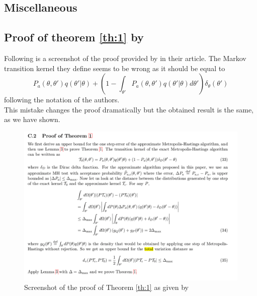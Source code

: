 \documentclass[11pt,a4paper]{report}\usepackage[]{graphicx}\usepackage[]{color}
\begin{document}
\begin{appendix}
\chapter{Miscellaneous}
\section{Proof of theorem \ref{th:1} by \cite{korattikara2014austerity}}

Following is a screenshot of the proof provided by \cite{korattikara2014austerity} in their article. The Markov transition kernel they define seems to be wrong as it should be equal to 
$$P_a(\theta,\theta')q(\theta'|\theta)+\left(1-\int_{\theta'}P_a(\theta,\theta')q(\theta'|\theta)d\theta'\right)\delta_{\theta}(\theta')$$ following the notation of the authors.\\ 
This mistake changes the proof dramatically but the obtained result is the same, as we have shown.
\begin{figure}[H]
    \centering
    \includegraphics[resolution=200]{korattikara_proof.png}
    \caption{Screenshot of the proof of Theorem \ref{th:1} as given by \cite{korattikara2014austerity}}
    \label{fig:korattikara_appendix}
\end{figure}


\end{appendix}
\end{document}
